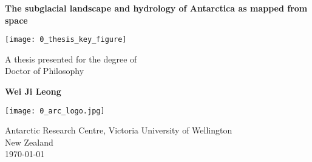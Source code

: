 \begin{titlepage}
  \begin{center}

    \LARGE
    \textbf{
      The subglacial landscape and hydrology of Antarctica as mapped from space
    }

    \texttt{[image: 0\_thesis\_key\_figure]}

    \Large
    A thesis presented for the degree of\\
    Doctor of Philosophy

    \vspace{0.8cm}

    \textbf{Wei Ji Leong}

    \texttt{[image: 0\_arc\_logo.jpg]}

    \Large
    Antarctic Research Centre, Victoria University of Wellington\\
    New Zealand\\
    \today

  \end{center}
\end{titlepage}
